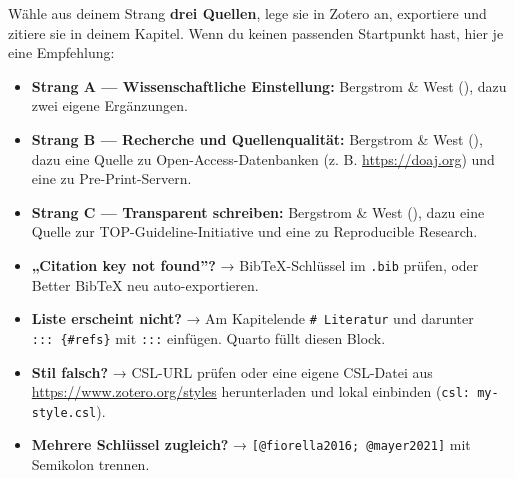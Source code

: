 \documentclass[
  ngerman,
  a4paper,
  DIV=11]{scrreprt}
\providecommand{\tightlist}{%
  \setlength{\itemsep}{0pt}\setlength{\parskip}{0pt}}
\begin{document}
\begin{tcolorbox}[enhanced jigsaw, opacitybacktitle=0.6, leftrule=.75mm, title=\textcolor{quarto-callout-tip-color}{\faLightbulb}\hspace{0.5em}{Mach mit --- strangbezogen}, colframe=quarto-callout-tip-color-frame, arc=.35mm, toprule=.15mm, colbacktitle=quarto-callout-tip-color!10!white, bottomrule=.15mm, colback=white, rightrule=.15mm, breakable, toptitle=1mm, bottomtitle=1mm, opacityback=0, titlerule=0mm, coltitle=black, left=2mm]

Wähle aus deinem Strang \textbf{drei Quellen}, lege sie in Zotero an,
exportiere und zitiere sie in deinem Kapitel. Wenn du keinen passenden
Startpunkt hast, hier je eine Empfehlung:

\begin{itemize}
\tightlist
\item
  \textbf{Strang A --- Wissenschaftliche Einstellung:} Bergstrom \& West
  (), dazu zwei eigene Ergänzungen.
\item
  \textbf{Strang B --- Recherche und Quellenqualität:} Bergstrom \& West
  (), dazu eine Quelle zu
  Open-Access-Datenbanken (z. B. \url{https://doaj.org}) und eine zu
  Pre-Print-Servern.
\item
  \textbf{Strang C --- Transparent schreiben:} Bergstrom \& West
  (), dazu eine Quelle zur
  TOP-Guideline-Initiative und eine zu Reproducible Research.
\end{itemize}

\end{tcolorbox}

\begin{tcolorbox}[enhanced jigsaw, opacitybacktitle=0.6, leftrule=.75mm, title=\textcolor{quarto-callout-warning-color}{\faExclamationTriangle}\hspace{0.5em}{Was, wenn \ldots{}}, colframe=quarto-callout-warning-color-frame, arc=.35mm, toprule=.15mm, colbacktitle=quarto-callout-warning-color!10!white, bottomrule=.15mm, colback=white, rightrule=.15mm, breakable, toptitle=1mm, bottomtitle=1mm, opacityback=0, titlerule=0mm, coltitle=black, left=2mm]

\begin{itemize}
\tightlist
\item
  \textbf{„Citation key not found''?} → BibTeX-Schlüssel im
  \texttt{.bib} prüfen, oder Better BibTeX neu auto-exportieren.
\item
  \textbf{Liste erscheint nicht?} → Am Kapitelende
  \texttt{\#\ Literatur} und darunter \texttt{:::\ \{\#refs\}} mit
  \texttt{:::} einfügen. Quarto füllt diesen Block.
\item
  \textbf{Stil falsch?} → CSL-URL prüfen oder eine eigene CSL-Datei aus
  \url{https://www.zotero.org/styles} herunterladen und lokal einbinden
  (\texttt{csl:\ my-style.csl}).
\item
  \textbf{Mehrere Schlüssel zugleich?} →
  \texttt{{[}@fiorella2016;\ @mayer2021{]}} mit Semikolon trennen.
\end{itemize}

\end{tcolorbox}
\end{document}
